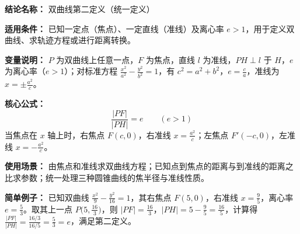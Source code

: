 \textbf{结论名称：} 双曲线第二定义（统一定义）

\textbf{适用条件：} 已知一定点（焦点）、一定直线（准线）及离心率 $e>1$，用于定义双曲线、求轨迹方程或进行距离转换。

\textbf{变量说明：} $P$ 为双曲线上任意一点，$F$ 为焦点，直线 $l$ 为准线，$PH\perp l$ 于 $H$，$e$ 为离心率（$e>1$）；对标准方程 $\frac{x^2}{a^2}-\frac{y^2}{b^2}=1$，有 $c^2=a^2+b^2$，$e=\frac{c}{a}$，准线为 $x=\pm\frac{a^2}{c}$。

\textbf{核心公式：}
\[
\boxed{\frac{|PF|}{|PH|} = e \qquad (e>1)}
\]
当焦点在 $x$ 轴上时，右焦点 $F(c,0)$，右准线 $x=\frac{a^2}{c}$；左焦点 $F'(-c,0)$，左准线 $x=-\frac{a^2}{c}$。

\textbf{使用场景：} 由焦点和准线求双曲线方程；已知点到焦点的距离与到准线的距离之比求参数；统一处理三种圆锥曲线的焦半径与准线性质。

\textbf{简单例子：} 已知双曲线 $\frac{x^2}{9}-\frac{y^2}{16}=1$，其右焦点 $F(5,0)$，右准线 $x=\frac{9}{5}$，离心率 $e=\frac{5}{3}$。取其上一点 $P\bigl(5,\frac{16}{3}\bigr)$，则 $|PF|=\frac{16}{3}$，$|PH|=5-\frac{9}{5}=\frac{16}{5}$，计算得 $\frac{|PF|}{|PH|}=\frac{16/3}{16/5}=\frac{5}{3}=e$，满足第二定义。